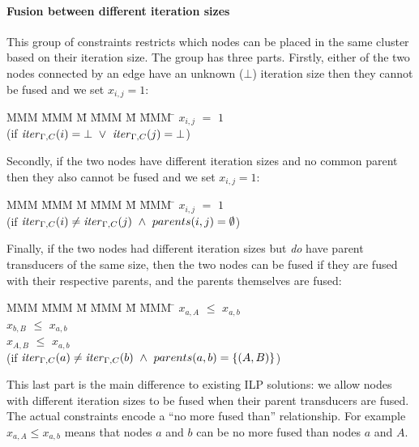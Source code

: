 \paragraph{Fusion between different iteration sizes} This group of constraints restricts which nodes can be placed in the same cluster based on their iteration size. The group has three parts. 
Firstly, either of the two nodes connected by an edge have an unknown ($\bot$) iteration size then they cannot be fused and we set $x_{i,j} = 1$:
\begin{tabbing}
MMM     \= MMM \= M \= MMM \= M \= MMM \= \kill
        \> $x_{i,j}$   \> $=$   \> $1$          \>       \>     \\
        \> (if $\mathit{iter}_{\Gamma,C}(i) = \bot 
                ~\vee~ \mathit{iter}_{\Gamma,C}(j) = \bot$)
\end{tabbing}
Secondly, if the two nodes have different iteration sizes and no common parent then they also cannot be fused and we set $x_{i,j} = 1$:
\begin{tabbing}
MMM     \= MMM \= M \= MMM \= M \= MMM \= \kill
        \> $x_{i,j}$   \> $=$   \> $1$          \>       \>     \\
        \> (if $\mathit{iter}_{\Gamma,C}(i) \not= \mathit{iter}_{\Gamma,C}(j) 
                ~\wedge~ parents(i,j) = \emptyset$)
\end{tabbing}
Finally, if the two nodes had different iteration sizes but \emph{do} have parent transducers of the same size, then the two nodes can be fused if they are fused with their respective parents, and the parents themselves are fused:
\begin{tabbing}
MMM     \= MMM \= M \= MMM \= M \= MMM \= \kill
        \> $x_{a,A}$   \> $\le$ \> $x_{a,b}$    \>       \>     \\
        \> $x_{b,B}$   \> $\le$ \> $x_{a,b}$    \>       \>     \\
        \> $x_{A,B}$   \> $\le$ \> $x_{a,b}$    \>       \>     \\
        \> (if $\mathit{iter}_{\Gamma,C}(a) \not= \mathit{iter}_{\Gamma,C}(b) 
                ~\wedge~ parents(a,b) = \{(A,B)\}$)
\end{tabbing}
This last part is the main difference to existing ILP solutions: we allow nodes with different iteration sizes to be fused when their parent transducers are fused. The actual constraints encode a ``no more fused than'' relationship. For example $x_{a,A} \le x_{a,b}$ means that nodes $a$ and $b$ can be no more fused than nodes $a$ and $A$. 

